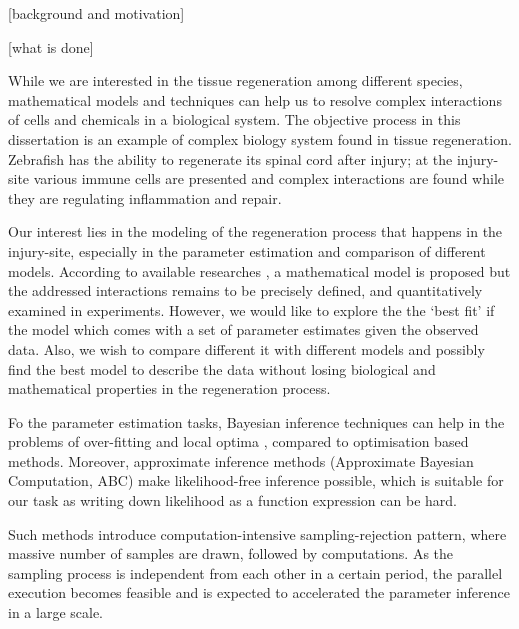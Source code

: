 \documentclass[12pt,a4paper]{report}
\begin{document}


 [background and motivation]

 [what is done]

While we are interested in the tissue regeneration among different species, mathematical models and techniques can help us to resolve complex interactions of cells and chemicals in a biological system. The objective process in this dissertation is an example of complex biology system found in tissue regeneration. Zebrafish has the ability to regenerate its spinal cord after injury; at the injury-site various immune cells are presented and complex interactions are found while they are regulating inflammation and repair.

Our interest lies in the modeling of the regeneration process that happens in the injury-site, especially in the parameter estimation and comparison of different models. According to available researches \cite{ref:Tsarouchas}, a mathematical model is proposed but the addressed interactions remains to be precisely defined, and quantitatively examined in experiments. However, we would like to explore the the `best fit' if the model which comes with a set of parameter estimates given the observed data. Also, we wish to compare different it with different models and possibly find the best model to describe the data without losing biological and mathematical properties in the regeneration process.

Fo the parameter estimation tasks, Bayesian inference techniques can help in the problems of over-fitting and local optima \cite{ref:abcsysbio}, compared to optimisation based methods. Moreover, approximate inference methods (Approximate Bayesian Computation, ABC) make likelihood-free inference possible, which is suitable for our task as writing down likelihood as a function expression can be hard.

Such methods introduce computation-intensive sampling-rejection pattern, where massive number of samples are drawn, followed by computations. As the sampling process is independent from each other in a certain period, the parallel execution becomes feasible and is expected to accelerated the parameter inference in a large scale.
\end{document}
